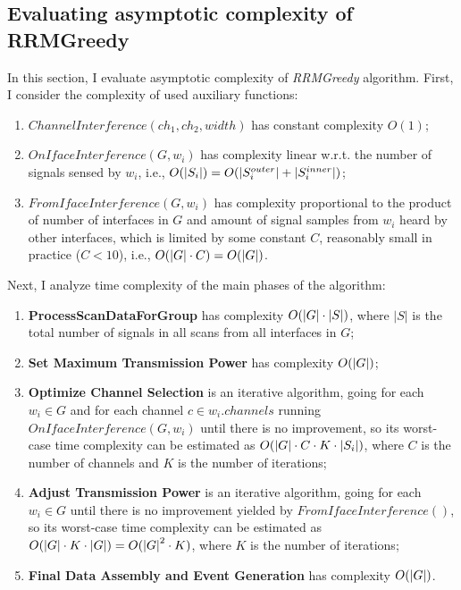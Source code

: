 \subsection{Evaluating asymptotic complexity of RRMGreedy}
\label{chapter:research:sec:rrmgreedy:subsec:complexity}
In this section, I evaluate asymptotic complexity of \textit{RRMGreedy} algorithm.
First, I consider the complexity of used auxiliary functions:
\begin{enumerate}
    \item $ChannelInterference(ch_1, ch_2, width)$ has constant complexity $O(1)$;
    \item $OnIfaceInterference(G, w_i)$ has complexity linear w.r.t. the number of signals sensed by $w_i$, i.e.,
        $O(\lvert{S_i}\rvert) = O(\lvert{S^{outer}_i}\rvert + \lvert{S^{inner}_i}\rvert)$;
    \item $FromIfaceInterference(G, w_i)$ has complexity proportional to the product of number of interfaces in $G$ and amount of signal samples from $w_i$ heard by other interfaces, which is limited by some constant $C$, reasonably small in practice ($C < 10$), i.e.,
        $O(\lvert{G}\rvert \cdot C) = O(\lvert{G}\rvert)$.
\end{enumerate}

Next, I analyze time complexity of the main phases of the algorithm:

\begin{enumerate}
    \item \textbf{ProcessScanDataForGroup} has complexity $O(\lvert{G}\rvert \cdot \lvert S \rvert)$, where $\lvert S \rvert$ is the total number of signals in all scans from all interfaces in $G$;
    \item \textbf{Set Maximum Transmission Power} has complexity $O(\lvert{G}\rvert)$;
    \item \textbf{Optimize Channel Selection} is an iterative algorithm, going for each $w_i \in G$ and for each channel $c \in w_i.channels$ running $OnIfaceInterference(G, w_i)$ until there is no improvement, so its worst-case time complexity can be estimated as $O(\lvert{G}\rvert \cdot C \cdot K \cdot \lvert{S_i}\rvert)$, where $C$ is the number of channels and $K$ is the number of iterations;
    \item \textbf{Adjust Transmission Power} is an iterative algorithm, going for each $w_i \in G$ until there is no improvement yielded by $FromIfaceInterference()$, so its worst-case time complexity can be estimated as $O(\lvert{G}\rvert \cdot K \cdot \lvert{G}\rvert) = O({\lvert{G}\rvert}^2 \cdot K)$, where $K$ is the number of iterations;
    \item \textbf{Final Data Assembly and Event Generation} has complexity $O(\lvert{G}\rvert)$.
\end{enumerate}

